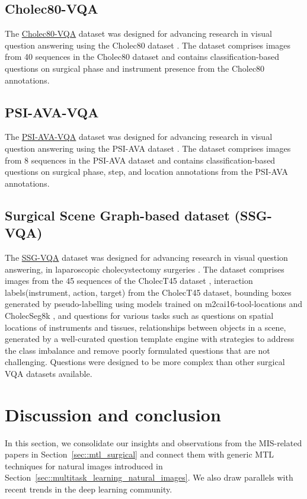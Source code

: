 \documentclass[times,twocolumn,final]{elsarticle}
\newcommand{\secref}[1]{Section~\ref{#1}}
\begin{document}
\subsection{Cholec80-VQA}
The \href{https://github.com/lalithjets/SurgicalGPT}{Cholec80-VQA} dataset was designed for advancing research in visual question answering using the Cholec80 dataset \citep{seenivasan2022surgical}. 
The dataset comprises images from 40 sequences in the Cholec80 dataset and contains classification-based questions on surgical phase and instrument presence from the Cholec80 annotations.

\subsection{PSI-AVA-VQA}
The \href{https://github.com/lalithjets/SurgicalGPT}{PSI-AVA-VQA} dataset was designed for advancing research in visual question answering using the PSI-AVA dataset \citep{seenivasan2023surgicalgpt}. 
The dataset comprises images from 8 sequences in the PSI-AVA dataset and contains classification-based questions on surgical phase, step, and location annotations from the PSI-AVA annotations.

\subsection{Surgical Scene Graph-based dataset (SSG-VQA)}
The \href{https://github.com/CAMMA-public/SSG-VQA}{SSG-VQA} dataset was designed for advancing research in visual question answering, in laparoscopic cholecystectomy surgeries \citep{yuan2024advancing}. 
The dataset comprises images from the 45 sequences of the CholecT45 dataset \citep{NWOYE2022102433_rendevous}, interaction labels(\textlangle{}instrument, action, target\textrangle) from the CholecT45 dataset, bounding boxes generated by pseudo-labelling using models trained on m2cai16-tool-locations \citep{jin2018tool} and CholecSeg8k \citep{cholecseg8k}, and questions for various tasks such as questions on spatial locations of instruments and tissues, relationships between objects in a scene,  generated by a well-curated question template engine with strategies to address the class imbalance and remove poorly formulated questions that are not challenging. Questions were designed to be more complex than other surgical VQA datasets available. 



\section{Discussion and conclusion} \label{sec::discussions_and_conclusions}
In this section, we consolidate our insights and observations from the MIS-related papers in \secref{sec::mtl_surgical} and connect them with generic MTL techniques for natural images introduced in \secref{sec::multitask_learning_natural_images}.
We also draw parallels with recent trends in the deep learning community.
\end{document}
